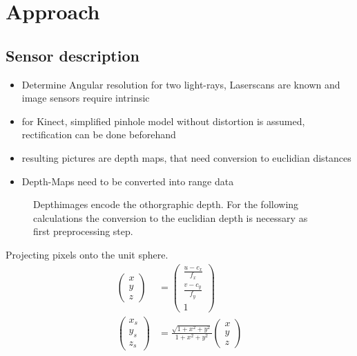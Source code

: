 \section{Approach}\label{approach}

\subsection{Sensor description}

\begin{itemize}
    \item Determine Angular resolution for two light-rays, Laserscans are known and image sensors require intrinsic
    \item for Kinect, simplified pinhole model without distortion is assumed, rectification can be done beforehand
    \item resulting pictures are depth maps, that need conversion to euclidian distances
    \item Depth-Maps need to be converted into range data
\end{itemize}

\begin{figure}[H]
    
    \caption[Range Data and Depth Maps visualized]{Depthimages encode the othorgraphic depth. For the following calculations the conversion to the euclidian depth is necessary as first preprocessing step.}
\end{figure}

Projecting pixels onto the unit sphere.
\begin{align}
	\begin{pmatrix}x \\ y \\ z \end{pmatrix} &= \begin{pmatrix} \frac{u - c_x}{f_x} \\ \frac{v - c_y}{f_y} \\ 1 \end{pmatrix} \\
	\begin{pmatrix}x_s \\ y_s \\ z_s \end{pmatrix} &= \frac{\sqrt{1 + x^2 + y^2}}{1 + x^2 + y^2} \begin{pmatrix} x \\ y \\ z \end{pmatrix}
\end{align}

